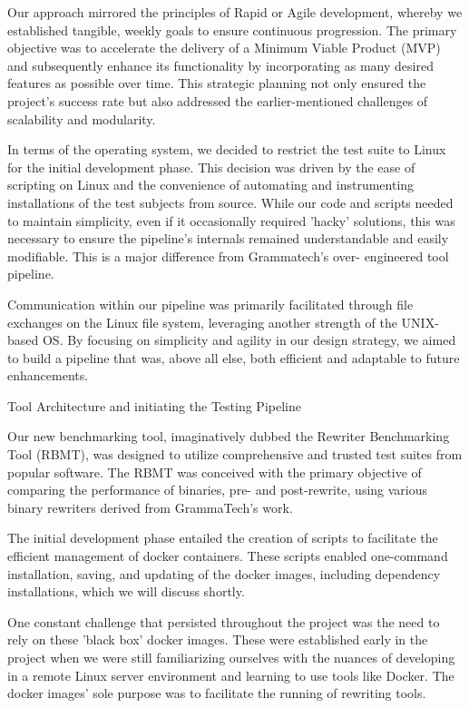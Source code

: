 \documentclass[a4paper,11pt,oneside]{report}
\begin{document}
Our approach mirrored the principles of Rapid or Agile development, whereby we
established tangible, weekly goals to ensure continuous progression. The primary objective
was to accelerate the delivery of a Minimum Viable Product (MVP) and subsequently
enhance its functionality by incorporating as many desired features as possible over time.
This strategic planning not only ensured the project's success rate but also addressed the
earlier-mentioned challenges of scalability and modularity.

In terms of the operating system, we decided to restrict the test suite to Linux for
the initial development phase. This decision was driven by the ease of scripting on Linux and
the convenience of automating and instrumenting installations of the test subjects from
source. While our code and scripts needed to maintain simplicity, even if it occasionally
required 'hacky' solutions, this was necessary to ensure the pipeline's internals remained
understandable and easily modifiable. This is a major difference from Grammatech’s over-
engineered tool pipeline.

Communication within our pipeline was primarily facilitated through file exchanges
on the Linux file system, leveraging another strength of the UNIX-based OS. By focusing on
simplicity and agility in our design strategy, we aimed to build a pipeline that was, above all
else, both efficient and adaptable to future enhancements.

Tool Architecture and initiating the Testing Pipeline

Our new benchmarking tool, imaginatively dubbed the Rewriter Benchmarking Tool
(RBMT), was designed to utilize comprehensive and trusted test suites from popular
software. The RBMT was conceived with the primary objective of comparing the
performance of binaries, pre- and post-rewrite, using various binary rewriters derived from
GrammaTech's work.

The initial development phase entailed the creation of scripts to facilitate the
efficient management of docker containers. These scripts enabled one-command
installation, saving, and updating of the docker images, including dependency installations,
which we will discuss shortly.

One constant challenge that persisted throughout the project was the need to rely
on these 'black box' docker images. These were established early in the project when we
were still familiarizing ourselves with the nuances of developing in a remote Linux server
environment and learning to use tools like Docker. The docker images' sole purpose was to
facilitate the running of rewriting tools.
\end{document}
